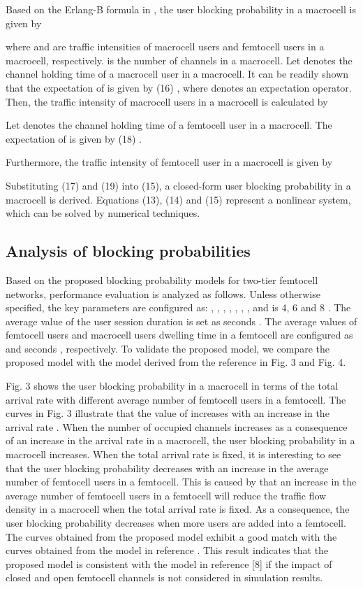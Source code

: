 \documentclass[10pt,final,journal,letterpaper,twoside,twocolumn]{IEEEtran}
\begin{document}
Based on the Erlang-B formula in \cite{Kleinrock75}, the user blocking probability in a macrocell is given by

where  and  are traffic intensities of macrocell users and
femtocell users in a macrocell, respectively.  is the number of
channels in a macrocell. Let  denotes the channel holding time of a macrocell
user in a macrocell. It can be readily shown that the expectation of  is given by (16) \cite{Zhang10},
where  denotes an expectation operator. Then, the traffic intensity of macrocell users  in a macrocell
is calculated by


Let  denotes the channel holding time of a femtocell user in a macrocell.
The expectation of  is given by (18) \cite{Zhang10} .


Furthermore, the traffic intensity of femtocell user  in a macrocell is given by


Substituting (17) and (19) into (15), a closed-form user blocking probability in a
macrocell is derived. Equations (13), (14) and (15) represent a nonlinear
system, which can be solved by numerical techniques.

\subsection{Analysis of blocking probabilities}

Based on the proposed blocking probability models for two-tier femtocell
networks, performance evaluation is analyzed as follows. Unless otherwise specified, the key
parameters are configured as: , , , , , ,  ,  and  is 4, 6 and 8 \cite{Mansfield08,ABI07}. The average value of the user session duration is set
as  seconds \cite{3g}. The average values of femtocell users and macrocell users dwelling time in a femtocell are configured as  and  seconds \cite{Zhang10,Xiang10},
respectively. To validate the proposed model, we compare the proposed model with the model derived from the reference \cite{Zhang10} in Fig. 3 and Fig. 4.


Fig. 3 shows the user blocking probability  in a macrocell in terms of the total
arrival rate  with different average number of femtocell users in a
femtocell. The curves in Fig. 3 illustrate that the value of 
increases with an increase in the arrival rate . When the number of
occupied channels increases as a consequence of an increase in the arrival rate in a macrocell, the user
blocking probability in a macrocell  increases. When the total arrival
rate  is fixed, it is interesting to see that the user blocking probability  decreases
with an increase in the average number of femtocell users in a femtocell. This is caused by that an increase in the average number of femtocell users in a femtocell will
reduce the traffic flow density in a macrocell when the total arrival rate  is fixed. As a consequence, the user blocking
probability  decreases when more users are added into a
femtocell. The curves obtained from the proposed model exhibit a good match with the curves obtained from the model in reference \cite{Zhang10}. This result indicates that the proposed model is consistent with the model in reference [8] if the impact of closed and open femtocell channels is not considered in simulation results.
\end{document}
